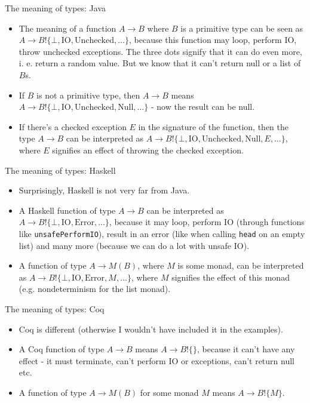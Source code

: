 \documentclass{beamer}
\newcommand{\eff}[2]{#1 ! \{ #2 \}}
\begin{document}
\begin{frame}{The meaning of types: Java}
\begin{itemize}
	\item The meaning of a function $A \to B$ where $B$ is a primitive type can be seen as $A \to \eff{B}{\bot, \text{IO}, \text{Unchecked}, \dots}$, because this function may loop, perform IO, throw unchecked exceptions. The three dots signify that it can do even more, i. e. return a random value. But we know that it can't return null or a list of $B$s.
	\item If $B$ is not a primitive type, then $A \to B$ means $A \to \eff{B}{\bot, \text{IO}, \text{Unchecked}, \text{Null}, \dots}$ - now the result can be null.
	\item If there's a checked exception $E$ in the signature of the function, then the type $A \to B$ can be interpreted as $A \to \eff{B}{\bot, \text{IO}, \text{Unchecked}, \text{Null}, E, \dots}$, where $E$ signifies an effect of throwing the checked exception.
\end{itemize}
\end{frame}


\begin{frame}{The meaning of types: Haskell}
\begin{itemize}
	\item Surprisingly, Haskell is not very far from Java.
	\item A Haskell function of type $A \to B$ can be interpreted as $A \to \eff{B}{\bot, \text{IO}, \text{Error}, \dots}$, because it may loop, perform IO (through functions like \texttt{unsafePerformIO}), result in an error (like when calling \texttt{head} on an empty list) and many more (because we can do a lot with unsafe IO).
	\item A function of type $A \to M(B)$, where $M$ is some monad, can be interpreted as $A \to \eff{B}{\bot, \text{IO}, \text{Error}, M, \dots}$, where $M$ signifies the effect of this monad (e.g. nondeterminism for the list monad).
\end{itemize}
\end{frame}


\begin{frame}{The meaning of types: Coq}
\begin{itemize}
	\item Coq is different (otherwise I wouldn't have included it in the examples).
	\item A Coq function of type $A \to B$ means $A \to \eff{B}{}$, because it can't have any effect - it must terminate, can't perform IO or exceptions, can't return null etc.
	\item A function of type $A \to M(B)$ for some monad $M$ means $A \to \eff{B}{M}$.
\end{itemize}
\end{frame}
\end{document}
